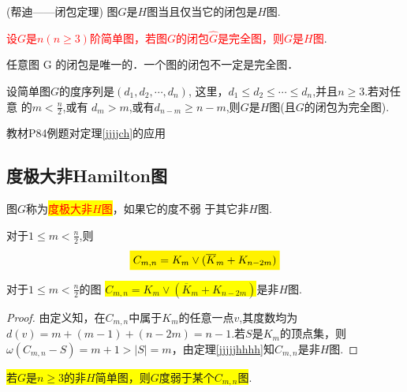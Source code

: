 \begin{theorem}[充要条件](帮迪——闭包定理)
	图$G$是$H$图当且仅当它的闭包是$H$图.
\end{theorem}
\begin{corollary}[充分条件]
	\textcolor{red}{设$G$是$n(n\geq 3)$阶简单图，若图$G$的闭包$\hat{G}$是完全图，则$G$是$H$图}.
\end{corollary}
\begin{note}
	任意图 G 的闭包是唯一的．一个图的闭包不一定是完全图．
\end{note}


\begin{theorem}[充分条件]
	\label{jjjjch}
	设简单图$G$的度序列是$(d_1,d_2,\cdots,d_n)$, 这里，$d_1\leq d_2\leq \cdots \leq d_n$,并且$n\geq3$.若对任意
	的$m<\frac{n}{2}$,或有 $d_m>m$,或有$d_{n-m} \geq n-m$,则$G$是$H$图(且$G$的闭包为完全图).
\end{theorem}
\begin{example}
	教材P84例题对定理\ref{jjjjch}的应用
\end{example}



\subsection{度极大非Hamilton图}

\begin{definition}
图$G$称为\colorbox{yellow}{\textcolor{red}{度极大非$H$图}}，如果它的度不弱
于其它非$H$图.
\end{definition}


\begin{definition}[$C_{m,n}$图]
	对于$1\leq m < \frac{n}{2}$,则
	\[
		\colorbox{yellow}{$C_{m,n} = K_m\lor(\overline{K}_m+K_{n-2m})$}
	\]
\end{definition}


\begin{lemma}
	对于$1\leq m < \frac{n}{2}$的图
\colorbox{yellow}{$C_{m,n} = K_m\lor(\overline{K}_m+K_{n-2m})$}是非$H$图.
\end{lemma}
\begin{proof}
	由定义知，在$C_{m,n}$中属于$K_m$的任意一点$v$,其度数均为$d(v)=m+(m-1)+(n-2m)=n-1$.若$S$是$K_m$的顶点集，则$\omega(C_{m,n}-S)=	m+1>|S|=m$，由定理\ref{jjjjjhhhh}知$C_{m,n}$是非$H$图.
\end{proof}

\begin{theorem}[Chvátal,1972]
	\label{jjjjsll}
\colorbox{yellow}{若$G$是$n\geq 3$的非$H$简单图，则$G$度弱于某个$C_{m,n}$图}.
\end{theorem}

